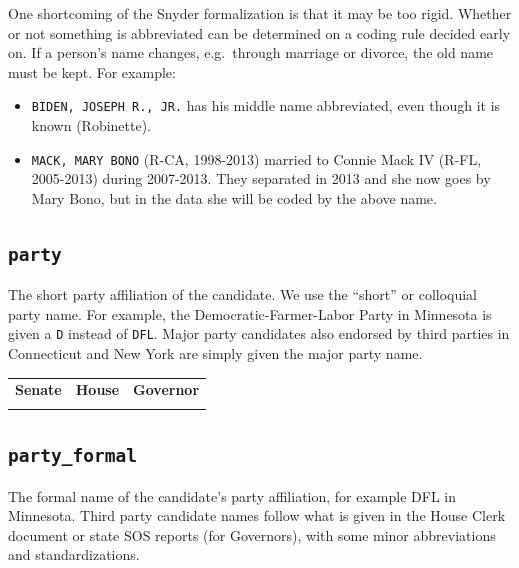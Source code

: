 \documentclass[12pt]{article}
\begin{document}
One shortcoming of the Snyder formalization is that it may be
{too} rigid. Whether or not something is abbreviated can be
determined on a coding rule decided early on. If a person's name
changes, e.g.~through marriage or divorce, the old name must be kept.
For example:

\begin{itemize}
\tightlist
\item
  \texttt{BIDEN,\ JOSEPH\ R.,\ JR.} has his middle name abbreviated,
  even though it is known (Robinette).
\item
  \texttt{MACK,\ MARY\ BONO} (R-CA, 1998-2013) married to Connie Mack IV
  (R-FL, 2005-2013) during 2007-2013. They separated in 2013 and she now
  goes by Mary Bono, but in the data she will be coded by the above
  name.
\end{itemize}


\newpage

\FloatBarrier


\subsection*{\texttt{party}}

The short party affiliation of the candidate. We use the ``short'' or colloquial party name. For example, the Democratic-Farmer-Labor Party in Minnesota is given a \texttt{D} instead of \texttt{DFL}. Major party candidates also endorsed by third parties in Connecticut and New York are simply given the major party name.
\begin{table}[!h]
\begin{adjustwidth}{-4em}{-4em}
\centering
\begin{tabularx}{\linewidth}{CCC}
\textbf{Senate} & \textbf{House} & \textbf{Governor}\\
   &  &
\end{tabularx}
\end{adjustwidth}
\end{table}


\FloatBarrier

\subsection*{\texttt{party\_formal}}
The formal name of the candidate's party affiliation, for example DFL in Minnesota. Third party candidate names follow what is given in the House Clerk document or state SOS reports (for Governors), with some minor abbreviations and standardizations.
\end{document}
